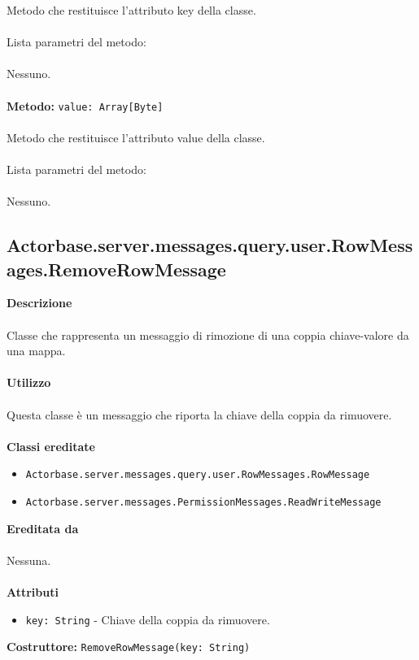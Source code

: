 \documentclass[a4paper]{article}
\begin{document}
		Metodo che restituisce l'attributo key della classe.
			\\ \\
		Lista parametri del metodo:
			\\ \\
			Nessuno.
			\\ \\
		\textbf{Metodo: }\texttt{value: Array[Byte]}
			\\ \\
		Metodo che restituisce l'attributo value della classe.
			\\ \\
		Lista parametri del metodo:
			\\ \\
			Nessuno.
			
	\subsection{Actorbase.server.messages.query.user.RowMessages.RemoveRowMessage}
		\textbf{Descrizione}
			\\ \\
		Classe che rappresenta un messaggio di rimozione di una coppia chiave-valore da una mappa.
			\\ \\
		\textbf{Utilizzo}
			\\ \\
		Questa classe è un messaggio che riporta la chiave della coppia da rimuovere.
			\\ \\
		\textbf{Classi ereditate}
			\begin{itemize}
				\item \texttt{Actorbase.server.messages.query.user.RowMessages.RowMessage }
				\item \texttt{Actorbase.server.messages.PermissionMessages.ReadWriteMessage }
			\end{itemize}
		\textbf{Ereditata da}
			\\ \\
			Nessuna.
			\\ \\
		\textbf{Attributi}
			\begin{itemize}
				\item \texttt{key: String} - Chiave della coppia da rimuovere.
			\end{itemize}
		\textbf{Costruttore: }\texttt{RemoveRowMessage(key: String)}
			\\ \\
\end{document}
